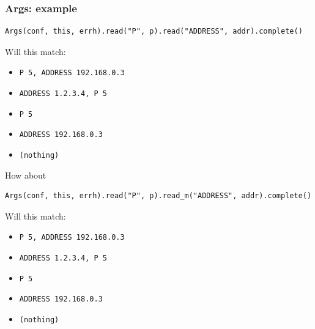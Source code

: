 \documentclass{beamer}
\begin{document}
\begin{frame}
\frametitle{Args: example}
\begin{lstlisting}
Args(conf, this, errh).read("P", p).read("ADDRESS", addr).complete()
\end{lstlisting}
Will this match:
\begin{itemize}
	\item \lstinline!P 5, ADDRESS 192.168.0.3!
	\item \lstinline!ADDRESS 1.2.3.4, P 5     !
	\item \lstinline!P 5                     !
	\item \lstinline!ADDRESS 192.168.0.3     !
	\item \lstinline!(nothing)               !
\end{itemize}
\framebreak
How about
\begin{lstlisting}
Args(conf, this, errh).read("P", p).read_m("ADDRESS", addr).complete()
\end{lstlisting}
Will this match:
\begin{itemize}
	\item \lstinline!P 5, ADDRESS 192.168.0.3!
	\item \lstinline!ADDRESS 1.2.3.4, P 5     !
	\item \lstinline!P 5                     !
	\item \lstinline!ADDRESS 192.168.0.3     !
	\item \lstinline!(nothing)               !
\end{itemize}
\end{frame}
\end{document}
